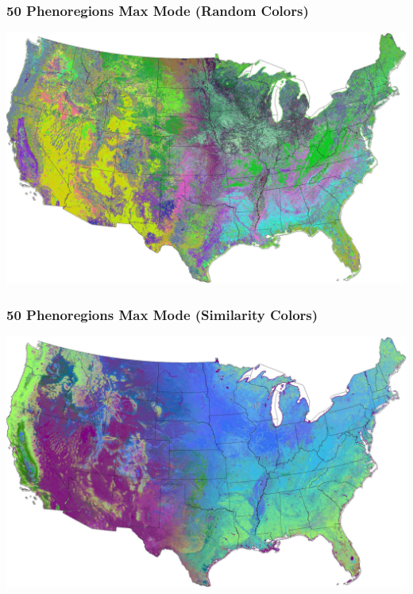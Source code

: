 \begin{frame}
 \frametitle{50 Phenoregions Max Mode (Random Colors)}
 \includegraphics[width=\textwidth]{figures/phendump.2000-2012.50.maxmode.large.GIMP.pdf}
\end{frame}

\begin{frame}
 \frametitle{50 Phenoregions Max Mode (Similarity Colors)}
 \includegraphics[width=\textwidth]{figures/phendump.2000-2012.50.maxmode.sim.GIMP.pdf}
\end{frame}

